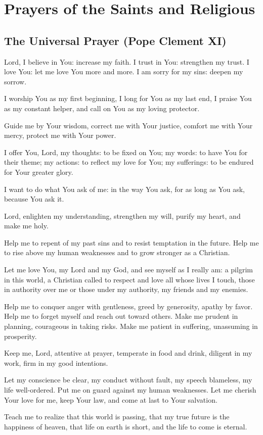\documentclass[12pt]{article}
\newcommand{\prayersection}[1]{\section{#1}}
\newcommand{\prayertitle}[1]{\subsection{#1}}
\begin{document}
\newpage

\prayersection{Prayers of the Saints and Religious}
\prayertitle{The Universal Prayer (Pope Clement XI)}
Lord, I believe in You: increase my faith.
I  trust in You: strengthen my trust.
I love You: let me love You more and more.
I am sorry for my sins: deepen my sorrow.

I worship You as my first beginning, I long for You as my last end, I praise You as my constant helper, and call on You as my loving protector.

Guide me by Your wisdom,
correct me with Your justice,
comfort me with Your mercy,
protect me with Your power.

I offer You, Lord, my thoughts: to be fixed on You;
my words: to have You for their theme;
my actions: to reflect my love for You;
my sufferings: to be endured for Your greater glory.

I want to do what You ask of me:
in the way You ask,
for as long as You ask,
because You ask it.

Lord, enlighten my understanding,
strengthen my will,
purify my heart,
and make me holy.

Help me to repent of my past sins and to resist temptation in the future.
Help me to rise above my human weaknesses and to grow stronger as a Christian.

Let me love You, my Lord and my God, and see myself as I really am:
a pilgrim in this world,
a Christian called to respect and love all whose lives I touch,
those in authority over me or those under my authority,
my friends and my enemies.

Help me to conquer anger with gentleness,
greed by generosity,
apathy by favor.
Help me to forget myself and reach out toward others.
Make me prudent in planning, courageous in taking risks.
Make me patient in suffering, unassuming in prosperity.

Keep me, Lord, attentive at prayer,
temperate in food and drink,
diligent in my work,
firm in my good intentions.

Let my conscience be clear,
my conduct without fault,
my speech blameless,
my life well-ordered.
Put me on guard against my human weaknesses.
Let me cherish Your love for me,
keep Your law,
and come at last to Your salvation.

Teach me to realize that this world is passing,
that my true future is the happiness of heaven,
that life on earth is short,
and the life to come is eternal.
\end{document}
